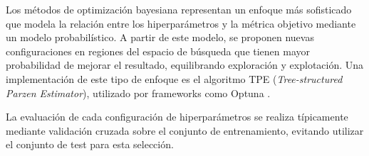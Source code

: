 Los métodos de optimización bayesiana representan un enfoque más sofisticado que modela la relación entre los hiperparámetros y la métrica objetivo mediante un modelo probabilístico. A partir de este modelo, se proponen nuevas configuraciones en regiones del espacio de búsqueda que tienen mayor probabilidad de mejorar el resultado, equilibrando exploración y explotación. Una implementación de este tipo de enfoque es el algoritmo TPE (\textit{Tree-structured Parzen Estimator}), utilizado por frameworks como Optuna \cite{akiba2019optuna}.

La evaluación de cada configuración de hiperparámetros se realiza típicamente mediante validación cruzada sobre el conjunto de entrenamiento, evitando utilizar el conjunto de test para esta selección.
